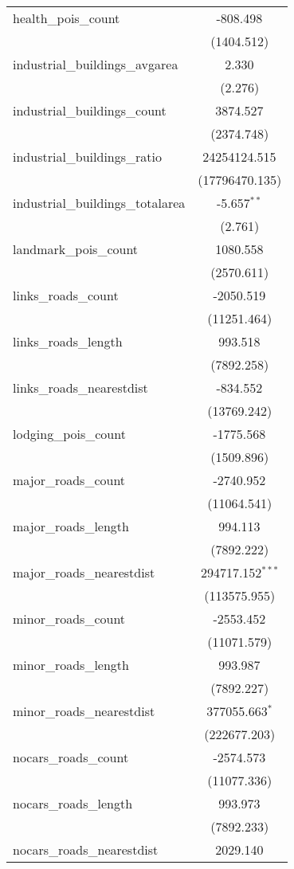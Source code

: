 \begin{table}[!htbp]
\begin{tabular}{@{\extracolsep{5pt}}lc}
 health_pois_count & -808.498$^{}$ \\
  & (1404.512) \\
 industrial_buildings_avgarea & 2.330$^{}$ \\
  & (2.276) \\
 industrial_buildings_count & 3874.527$^{}$ \\
  & (2374.748) \\
 industrial_buildings_ratio & 24254124.515$^{}$ \\
  & (17796470.135) \\
 industrial_buildings_totalarea & -5.657$^{**}$ \\
  & (2.761) \\
 landmark_pois_count & 1080.558$^{}$ \\
  & (2570.611) \\
 links_roads_count & -2050.519$^{}$ \\
  & (11251.464) \\
 links_roads_length & 993.518$^{}$ \\
  & (7892.258) \\
 links_roads_nearestdist & -834.552$^{}$ \\
  & (13769.242) \\
 lodging_pois_count & -1775.568$^{}$ \\
  & (1509.896) \\
 major_roads_count & -2740.952$^{}$ \\
  & (11064.541) \\
 major_roads_length & 994.113$^{}$ \\
  & (7892.222) \\
 major_roads_nearestdist & 294717.152$^{***}$ \\
  & (113575.955) \\
 minor_roads_count & -2553.452$^{}$ \\
  & (11071.579) \\
 minor_roads_length & 993.987$^{}$ \\
  & (7892.227) \\
 minor_roads_nearestdist & 377055.663$^{*}$ \\
  & (222677.203) \\
 nocars_roads_count & -2574.573$^{}$ \\
  & (11077.336) \\
 nocars_roads_length & 993.973$^{}$ \\
  & (7892.233) \\
 nocars_roads_nearestdist & 2029.140$^{}$ \\

\end{tabular}
\end{table}
